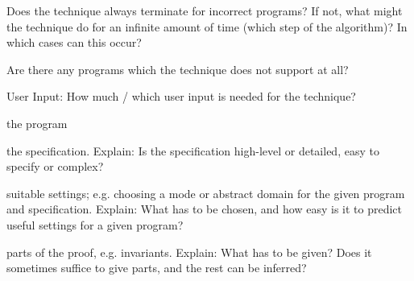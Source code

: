 \documentclass[a4paper]{article}
\begin{document}
\begin{minipage}[t]{0.16\linewidth}
\begin{betterlist}
\begin{betterlist}
\begin{betterlist}
				\item Does the technique always terminate for incorrect programs? If not, what might the technique do for an infinite amount of time (which step of the algorithm)? In which cases can this occur?

			\end{betterlist}
			\item Are there any programs which the technique does not support at all?

		\end{betterlist}
		\item \alert{User Input:} How much / which user input is needed for the technique?
		\begin{betterlist}
			\item \checkboxChecked the program
			\item \checkboxChecked the specification. Explain: Is the specification high-level or detailed, easy to specify or complex?

			\item \checkboxUnchecked suitable settings; e.g. choosing a mode or abstract domain for the given program and specification. Explain: What has to be chosen, and how easy is it to predict useful settings for a given program?

			\item \checkboxUnchecked parts of the proof, e.g. invariants. Explain: What has to be given? Does it sometimes suffice to give parts, and the rest can be inferred?


\end{betterlist}
\end{betterlist}
\end{minipage}
\end{document}
